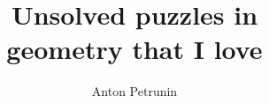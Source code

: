 \documentclass[twoside]{book}
\begin{document}
\title{Unsolved puzzles in\\ 
geometry that I love}
\author{Anton Petrunin}
\date{}
\maketitle



\thispagestyle{empty}
\tableofcontents
\thispagestyle{empty}

\newpage
\thispagestyle{empty}







\backmatter
\newpage
{}
{\scriptsize

}
\sloppy
\printbibliography[heading=bibintoc]
\fussy
\end{document}
